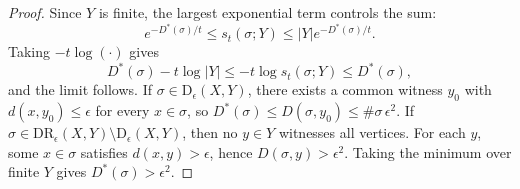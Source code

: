 \documentclass[10pt,a4paper]{amsart}
\newcommand{\Dow}{\mathrm{D}}
\newcommand{\DR}{\mathrm{DR}}
\begin{document}
\begin{proof}
Since $Y$ is finite, the largest exponential term controls the sum:
\[
e^{-D^{*}(\sigma)/t}\le s_t(\sigma;Y)\le |Y|e^{-D^{*}(\sigma)/t}.
\]
Taking $-t\log(\cdot)$ gives
\[
D^{*}(\sigma)-t\log |Y|\le -t\log s_t(\sigma;Y)\le D^{*}(\sigma),
\]
and the limit follows. If $\sigma\in\Dow_\epsilon(X,Y)$, there exists a common witness $y_0$
with $d(x,y_0)\le\epsilon$ for every $x\in\sigma$, so
$D^{*}(\sigma)\le D(\sigma,y_0)\le \#\sigma\,\epsilon^2$. If
$\sigma\in\DR_\epsilon(X,Y)\setminus\Dow_\epsilon(X,Y)$, then no $y\in Y$ witnesses all vertices.
For each $y$, some $x\in\sigma$ satisfies $d(x,y)>\epsilon$, hence
$D(\sigma,y)>\epsilon^2$. Taking the minimum over finite $Y$ gives
$D^{*}(\sigma)>\epsilon^2$.
\end{proof}
\end{document}
